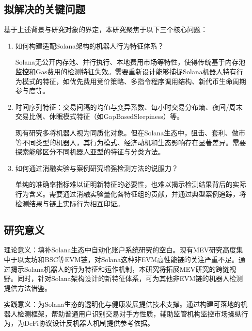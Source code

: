 \subsection{拟解决的关键问题}

\par 基于上述背景与研究对象的界定，本研究聚焦于以下三个核心问题：
\begin{enumerate}
    \item 如何构建适配Solana架构的机器人行为特征体系？
    \par Solana无公开内存池、并行执行、本地费用市场等特性，使得传统基于内存池监控和Gas费用的检测特征失效。需要重新设计能够捕捉Solana机器人特有行为模式的特征，如优先费用竞价策略、多指令程序调用结构、新代币生命周期参与度等。
    \item 时间序列特征：交易间隔的均值与变异系数、每小时交易分布熵、夜间/周末交易比例、休眠模式特征（如GapBasedSleepiness）等。
    \par 现有研究多将机器人视为同质化对象。但在Solana生态中，狙击、套利、做市等不同类型的机器人，其行为模式、经济动机和生态影响存在显著差异。需要探索能够区分不同机器人亚型的特征与分类方法。
    \item 如何通过消融实验与案例研究增强检测方法的说服力？
    \par 单纯的准确率指标难以证明新特征的必要性，也难以揭示检测结果背后的实际行为含义。需要通过消融实验量化各特征组的贡献，并通过典型案例追踪，将检测结果与链上实际行为相互印证。
\end{enumerate}

\subsection{研究意义}

\par 理论意义：填补Solana生态中自动化账户系统研究的空白。现有MEV研究高度集中于以太坊和BSC等EVM链，对Solana这种非EVM高性能链的关注严重不足。通过揭示Solana机器人的行为特征和运作机制，本研究将拓展MEV研究的跨链视野。同时，针对Solana架构设计的新特征体系，可为其他非EVM链的机器人检测提供方法借鉴。
\par 实践意义：为Solana生态的透明化与健康发展提供技术支撑。通过构建可落地的机器人检测框架，帮助普通用户识别交易对手方性质，辅助监管机构监控市场操纵行为，为DeFi协议设计反机器人机制提供参考依据。

